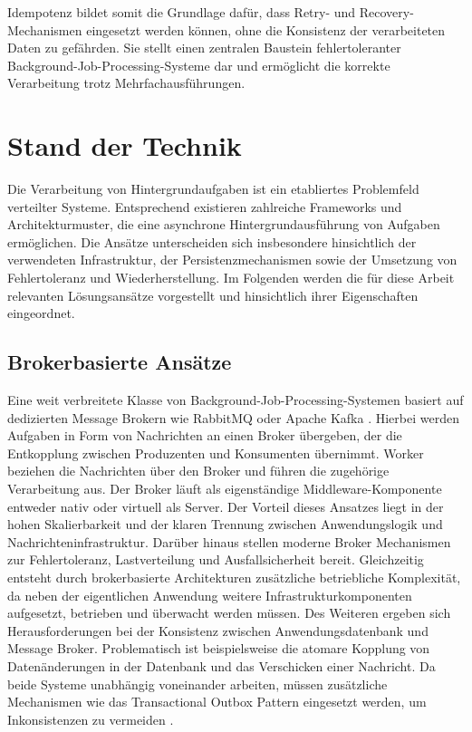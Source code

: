 Idempotenz bildet somit die Grundlage dafür, dass Retry- und Recovery-Mechanismen eingesetzt werden können, ohne die Konsistenz
der verarbeiteten Daten zu gefährden.
Sie stellt einen zentralen Baustein fehlertoleranter Background-Job-Processing-Systeme dar und ermöglicht die korrekte
Verarbeitung trotz Mehrfachausführungen.

\section{Stand der Technik}
\label{sec:technikstand}
Die Verarbeitung von Hintergrundaufgaben ist ein etabliertes Problemfeld verteilter Systeme.
Entsprechend existieren zahlreiche Frameworks und Architekturmuster, die eine asynchrone Hintergrundausführung von Aufgaben ermöglichen.
Die Ansätze unterscheiden sich insbesondere hinsichtlich der verwendeten Infrastruktur, der Persistenzmechanismen sowie
der Umsetzung von Fehlertoleranz und Wiederherstellung.
Im Folgenden werden die für diese Arbeit relevanten Lösungsansätze vorgestellt und hinsichtlich ihrer Eigenschaften eingeordnet.

\subsection{Brokerbasierte Ansätze}
\label{subsec:brokerbasierteAnsaetze}
Eine weit verbreitete Klasse von Background-Job-Processing-Systemen basiert auf dedizierten Message Brokern wie RabbitMQ \parencite{broadcom_inc_hrsg_rabbitmq_2026}
oder Apache Kafka \parencite{apache_software_foundation_hrsg_apache_2026}.
Hierbei werden Aufgaben in Form von Nachrichten an einen Broker übergeben, der die Entkopplung zwischen Produzenten und Konsumenten übernimmt.
Worker beziehen die Nachrichten über den Broker und führen die zugehörige Verarbeitung aus.
Der Broker läuft als eigenständige Middleware-Komponente entweder nativ oder virtuell als Server.
Der Vorteil dieses Ansatzes liegt in der hohen Skalierbarkeit und der klaren Trennung zwischen Anwendungslogik und Nachrichteninfrastruktur.
Darüber hinaus stellen moderne Broker Mechanismen zur Fehlertoleranz, Lastverteilung und Ausfallsicherheit bereit.
Gleichzeitig entsteht durch brokerbasierte Architekturen zusätzliche betriebliche Komplexität, da neben der eigentlichen Anwendung weitere
Infrastrukturkomponenten aufgesetzt, betrieben und überwacht werden müssen.
Des Weiteren ergeben sich Herausforderungen bei der Konsistenz zwischen Anwendungsdatenbank und Message Broker.
Problematisch ist beispielsweise die atomare Kopplung von Datenänderungen in der Datenbank und das Verschicken einer Nachricht.
Da beide Systeme unabhängig voneinander arbeiten, müssen zusätzliche Mechanismen wie das Transactional Outbox Pattern eingesetzt
werden, um Inkonsistenzen zu vermeiden \parencite[Kap.~3.3.7]{richardson_microservices_2018}.

